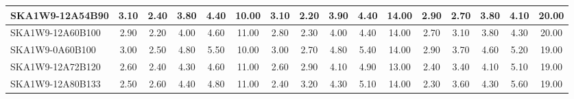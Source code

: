 \begin{table}[H]
{{\begin{tabular}{|lccccc||ccccc||ccccc|}
SKA1W9-12A54B90 & 3.10 \cellcolor{blue!60.00} & 2.40 \cellcolor{red!23.60} & 3.80 \cellcolor{green!18.00} & 4.40 \cellcolor{orange!18.00} & 10.00 \cellcolor{purple!27.69} & 3.10 \cellcolor{blue!60.00} & 2.20 \cellcolor{red!18.00} & 3.90 \cellcolor{green!18.00} & 4.40 \cellcolor{orange!18.00} & 14.00 \cellcolor{purple!60.00} & 2.90 \cellcolor{blue!49.50} & 2.70 \cellcolor{red!18.00} & 3.80 \cellcolor{green!18.00} & 4.10 \cellcolor{orange!18.00} & 20.00 \cellcolor{purple!60.00}\\ \hline 
SKA1W9-12A60B100 & 2.90 \cellcolor{blue!46.00} & 2.20 \cellcolor{red!18.00} & 4.00 \cellcolor{green!26.40} & 4.60 \cellcolor{orange!25.64} & 11.00 \cellcolor{purple!60.00} & 2.80 \cellcolor{blue!42.00} & 2.30 \cellcolor{red!20.47} & 4.00 \cellcolor{green!22.67} & 4.40 \cellcolor{orange!18.00} & 14.00 \cellcolor{purple!60.00} & 2.70 \cellcolor{blue!39.00} & 3.10 \cellcolor{red!32.00} & 3.80 \cellcolor{green!18.00} & 4.30 \cellcolor{orange!23.60} & 20.00 \cellcolor{purple!60.00}\\ \hline 
SKA1W9-0A60B100 & 3.00 \cellcolor{blue!53.00} & 2.50 \cellcolor{red!26.40} & 4.80 \cellcolor{green!60.00} & 5.50 \cellcolor{orange!60.00} & 10.00 \cellcolor{purple!27.69} & 3.00 \cellcolor{blue!54.00} & 2.70 \cellcolor{red!30.35} & 4.80 \cellcolor{green!60.00} & 5.40 \cellcolor{orange!60.00} & 14.00 \cellcolor{purple!60.00} & 2.90 \cellcolor{blue!49.50} & 3.70 \cellcolor{red!53.00} & 4.60 \cellcolor{green!60.00} & 5.20 \cellcolor{orange!48.80} & 19.00 \cellcolor{purple!18.00}\\ \hline 
SKA1W9-12A72B120 & 2.60 \cellcolor{blue!25.00} & 2.40 \cellcolor{red!23.60} & 4.30 \cellcolor{green!39.00} & 4.60 \cellcolor{orange!25.64} & 11.00 \cellcolor{purple!60.00} & 2.60 \cellcolor{blue!30.00} & 2.90 \cellcolor{red!35.29} & 4.10 \cellcolor{green!27.33} & 4.90 \cellcolor{orange!39.00} & 13.00 \cellcolor{purple!18.00} & 2.40 \cellcolor{blue!23.25} & 3.40 \cellcolor{red!42.50} & 4.10 \cellcolor{green!33.75} & 5.10 \cellcolor{orange!46.00} & 19.00 \cellcolor{purple!18.00}\\ \hline 
SKA1W9-12A80B133 & 2.50 \cellcolor{blue!18.00} & 2.60 \cellcolor{red!29.20} & 4.40 \cellcolor{green!43.20} & 4.80 \cellcolor{orange!33.27} & 11.00 \cellcolor{purple!60.00} & 2.40 \cellcolor{blue!18.00} & 3.20 \cellcolor{red!42.71} & 4.30 \cellcolor{green!36.67} & 5.10 \cellcolor{orange!47.40} & 14.00 \cellcolor{purple!60.00} & 2.30 \cellcolor{blue!18.00} & 3.60 \cellcolor{red!49.50} & 4.30 \cellcolor{green!44.25} & 5.60 \cellcolor{orange!60.00} & 19.00 \cellcolor{purple!18.00}\\ \hline 

\end{tabular}}}
\end{table}
